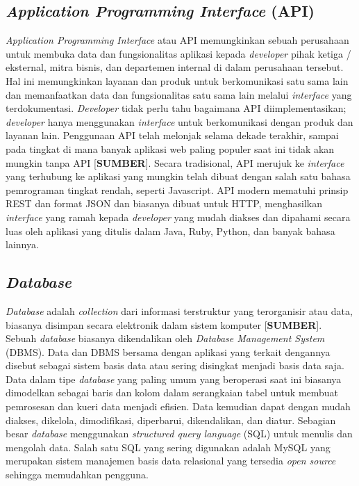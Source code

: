 \begin{flushleft}
\begin{justify}
        \subsection{\textit{Application Programming Interface} (API)}
            \textit{Application Programming Interface} atau API memungkinkan sebuah perusahaan untuk membuka data dan fungsionalitas aplikasi kepada \textit{developer} pihak ketiga / eksternal, mitra bisnis, dan departemen internal di dalam perusahaan tersebut. 
            Hal ini memungkinkan layanan dan produk untuk berkomunikasi satu sama lain dan memanfaatkan data dan fungsionalitas satu sama lain melalui \textit{interface} yang terdokumentasi. 
            \textit{Developer} tidak perlu tahu bagaimana API diimplementasikan; \textit{developer} hanya menggunakan \textit{interface} untuk berkomunikasi dengan produk dan layanan lain. 
            Penggunaan API telah melonjak selama dekade terakhir, sampai pada tingkat di mana banyak aplikasi web paling populer saat ini tidak akan mungkin tanpa API [\textbf{SUMBER}]. Secara tradisional, API merujuk ke \textit{interface} yang terhubung ke aplikasi yang mungkin telah dibuat dengan salah satu bahasa pemrograman tingkat rendah, seperti Javascript. API modern mematuhi prinsip REST dan format JSON dan biasanya dibuat untuk HTTP, menghasilkan \textit{interface} yang ramah kepada \textit{developer} yang mudah diakses dan dipahami secara luas oleh aplikasi yang ditulis dalam Java, Ruby, Python, dan banyak bahasa lainnya.
            \\


        \subsection{\textit{Database}}
        \textit{Database} adalah \textit{collection} dari informasi terstruktur yang terorganisir atau data, biasanya disimpan secara elektronik dalam sistem komputer [\textbf{SUMBER}]. Sebuah \textit{database} biasanya dikendalikan oleh \textit{Database Management System} (DBMS). Data dan DBMS bersama dengan aplikasi yang terkait dengannya disebut sebagai sistem basis data atau sering disingkat menjadi basis data saja.
        Data dalam tipe \textit{database} yang paling umum yang beroperasi saat ini biasanya dimodelkan sebagai baris dan kolom dalam serangkaian tabel untuk membuat pemrosesan dan kueri data menjadi efisien. Data kemudian dapat dengan mudah diakses, dikelola, dimodifikasi, diperbarui, dikendalikan, dan diatur. Sebagian besar \textit{database} menggunakan \textit{structured query language} (SQL) untuk menulis dan mengolah data. 
        Salah satu SQL yang sering digunakan adalah MySQL yang merupakan sistem manajemen basis data relasional yang tersedia \textit{open source} sehingga memudahkan pengguna.
        \\

\end{justify}
\end{flushleft}
